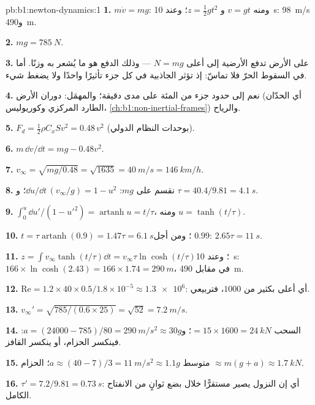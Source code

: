 \begin{solution}{pb:b1:newton-dynamics:1}
\textbf{1.} $m\dot v = mg$: ومنه $v = gt$ و $z = \tfrac12 gt^2$؛ وعند \qty{10}{s}:
\qty{98}{m/s} و\qty{490}{m}.

\textbf{2.} $mg = \qty{785}{N}$.

\textbf{3.} على الأرض تدفع الأرضية إلى أعلى  $N = mg$ --- وذلك الدفع
هو ما يُشعر به وزنًا. أما في السقوط الحرّ فلا  تماسّ:
إذ تؤثر الجاذبية في كل جزء تأثيرًا واحدًا ولا يضغط شيء.

\textbf{4.} نعم إلى حدود جزء من المئة على مدى دقيقة؛ والمهمَل:
دوران الأرض (أي الحدّان الطارد المركزي وكوريوليس،
\cref{ch:b1:non-inertial-frames}) والرياح.

\textbf{5.} $F_d = \tfrac12\rho C_xSv^2 = 0.48\,v^2$ (بوحدات النظام الدولي).

\textbf{6.} $m\,\dd v/\dd t = mg - 0.48v^2$.

\textbf{7.} $v_\infty = \sqrt{mg/0.48} = \sqrt{1635} = \qty{40}{m/s} =
\qty{146}{km/h}$.

\textbf{8.} نقسم على $mg$: $\dd u/\dd t\,(v_\infty/g) = 1 - u^2$؛ و
$\tau = 40.4/9.81 = \qty{4.1}{s}$.

\textbf{9.} $\int_0^u\dd u'/(1 - u'^2) = \operatorname{artanh}u = t/\tau$،
ومنه $u = \tanh(t/\tau)$.

\textbf{10.} $t = \tau\operatorname{artanh}(0.9) = 1.47\tau = \qty{6.1}{s}$؛
ومن أجل $0.99$: $2.65\tau = \qty{11}{s}$.

\textbf{11.} $z = \int v_\infty\tanh(t/\tau)\dd t = v_\infty\tau\ln\cosh(t/\tau)$؛
وعند \qty{10}{s}: $166 \times \ln\cosh(2.43) = 166 \times 1.74 = \qty{290}{m}$،
في مقابل \qty{490}{m}.

\textbf{12.} $\mathrm{Re} = 1.2 \times 40 \times 0.5/1.8\times10^{-5} \approx
\num{1.3e6}$: أي أعلى بكثير من $1000$، فتربيعي.

\textbf{13.} $v_\infty' = \sqrt{785/(0.6 \times 25)} = \sqrt{52} = \qty{7.2}{m/s}$.

\textbf{14.} السحب $= 15 \times 1600 = \qty{24}{kN}$؛ و$a = (24000 - 785)/80
= \qty{290}{m/s^2} \approx 30g$: فينكسر الحزام، أو ينكسر القافز.

\textbf{15.} متوسط $a \approx (40 - 7)/3 = \qty{11}{m/s^2} \approx 1.1g$؛
 الحزام $\approx m(g + a) \approx \qty{1.7}{kN}$.

\textbf{16.} $\tau' = 7.2/9.81 = \qty{0.73}{s}$: أي إن النزول يصير مستقرًّا خلال
بضع ثوانٍ من الانفتاح الكامل.


\end{solution}
